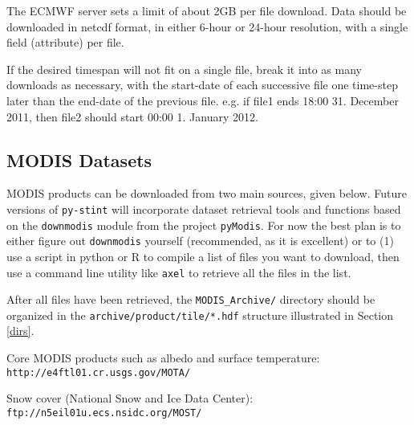 \documentclass[twoside,a4paper]{refart}
\begin{document}
\attention
The ECMWF server sets a limit of about 2GB per file download.  Data should be downloaded in netcdf format, in either 6-hour or 24-hour resolution, with a single field (attribute) per file. 

If the desired timespan will not fit on a single file, break it into as many downloads as necessary, with the start-date of each successive file one time-step later than the end-date of the previous file. e.g. if file1 ends 18:00 31. December 2011, then file2 should start 00:00 1. January 2012.

\subsection{MODIS Datasets}\label{modis}
MODIS products can be downloaded from two main sources, given below.  Future versions of \texttt{py-stint} will incorporate dataset retrieval tools and functions based on the \texttt{downmodis} module from the project \texttt{pyModis}. For now the best plan is to either figure out \texttt{downmodis} yourself (recommended, as it is excellent) or to (1) use a script in python or R to compile a list of files you want to download, then use a command line utility like \texttt{axel} to retrieve all the files in the list.

After all files have been retrieved, the \texttt{MODIS\_Archive/} directory should be organized in the \texttt{archive/product/tile/*.hdf} structure illustrated in Section \ref{dirs}. 

Core MODIS products such as albedo and surface temperature:\\
\texttt{http://e4ftl01.cr.usgs.gov/MOTA/}


Snow cover (National Snow and Ice Data Center):\\
\texttt{ftp://n5eil01u.ecs.nsidc.org/MOST/}
\end{document}
